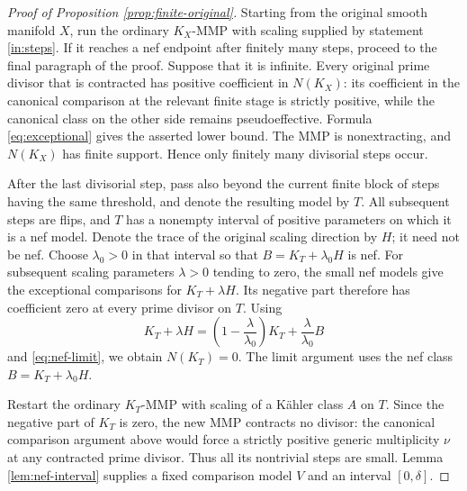 \documentclass[11pt,a4paper]{article}
\theoremstyle{definition}\newtheorem{definition}[theorem]{Definition}
\theoremstyle{remark}\newtheorem*{remark}{Remark}
\begin{document}
\begin{proof}[Proof of Proposition \ref{prop:finite-original}]
Starting from the original smooth manifold $X$, run the ordinary $K_X$-MMP
with scaling supplied by statement \ref{in:steps}. If it reaches a nef endpoint
after finitely many steps, proceed to the final paragraph of the proof.
Suppose that it is infinite. Every original prime divisor that is contracted
has positive coefficient in $N(K_X)$: its coefficient in the canonical
comparison at the relevant finite stage is strictly positive, while the
canonical class on the other side remains pseudoeffective. Formula
\eqref{eq:exceptional} gives the asserted lower bound. The MMP is
nonextracting, and $N(K_X)$ has finite support. Hence only finitely many
divisorial steps occur.

After the last divisorial step, pass also beyond the current finite block of
steps having the same threshold, and denote the resulting model by $T$.
All subsequent steps are flips, and $T$ has a nonempty interval of positive
parameters on which it is a nef model. Denote the trace of the original
scaling direction by $H$; it need not be nef. Choose $\lambda_0>0$ in that
interval so that $B=K_T+\lambda_0H$ is nef.
For subsequent scaling parameters $\lambda>0$ tending to zero, the small nef
models give the exceptional comparisons for $K_T+\lambda H$. Its negative
part therefore has coefficient zero at every prime divisor on $T$.
Using
\[
 K_T+\lambda H
 =\left(1-\frac{\lambda}{\lambda_0}\right)K_T
  +\frac{\lambda}{\lambda_0}B
\]
and \eqref{eq:nef-limit}, we obtain $N(K_T)=0$.
The limit argument uses the nef class $B=K_T+\lambda_0H$.

Restart the ordinary $K_T$-MMP with scaling of a Kähler class $A$ on $T$.
Since the negative part of $K_T$ is zero, the new MMP contracts no divisor:
the canonical comparison argument above would force a strictly positive
generic multiplicity $\nu$ at any contracted prime divisor. Thus all its
nontrivial steps are small. Lemma \ref{lem:nef-interval} supplies a fixed
comparison model $V$ and an interval $[0,\delta]$.


\end{proof}
\end{document}
